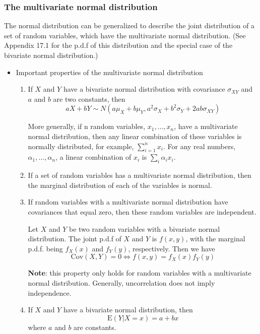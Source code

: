\documentclass[a4paper,11pt]{article}
\begin{document}
\subsubsection*{The multivariate normal distribution}
\label{sec:org557a985}

The normal distribution can be generalized to describe the joint
distribution of a set of random variables, which have the multivariate
normal distribution. (See Appendix 17.1 for the p.d.f of this
distribution and the special case of the bivariate normal
distribution.)

\begin{itemize}
\item Important properties of the multivariate normal distribution
\label{sec:org21dda80}

\begin{enumerate}
\item If \(X\) and \(Y\) have a bivariate normal distribution with covariance
\(\sigma_{XY}\) and \(a\) and \(b\) are two constants, then
\[
   aX + bY \sim N(a\mu_X + b\mu_Y, a^2\sigma_X + b^2\sigma_Y +
   2ab\sigma_{XY})
   \]

More generally, if n random variables, \(x_1, \ldots, x_n\), have a
multivariate normal distribution, then any linear combination of
these variables is normally distributed, for example, \(\sum_{i=1}^n
   x_i\). For any real numbers, \(\alpha_1, \ldots, \alpha_n\), a linear
combination of \({x_i}\) is \(\sum_i \alpha_i x_i\).

\item If a set of random variables has a multivariate normal
distribution, then the marginal distribution of each of the
variables is normal.

\item If random variables with a multivariate normal distribution have
covariances that equal zero, then these random variables are
independent.

Let \(X\) and \(Y\) be two random variables with a bivariate normal
distribution. The joint p.d.f of \(X\) and \(Y\) is \(f(x, y)\), with the
marginal p.d.f. being \(f_X(x)\) and \(f_Y(y)\), respectively. Then we have
\[ \mathrm{Cov}(X, Y) = 0 \Leftrightarrow f(x, y) = f_X(x)f_Y(y) \]

\textbf{Note}: this property only holds for random variables with a
multivariate normal distribution. Generally, uncorrelation does not
imply independence.

\item If \(X\) and \(Y\) have a bivariate normal distribution, then
\[\mathrm{E}(Y|X = x) = a + bx \]
where \(a\) and \(b\) are constants.
\end{enumerate}
\end{itemize}
\end{document}
